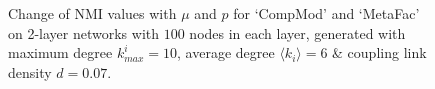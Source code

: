 \begin{figure}
\begin{center}

\end{center}\vspace{-0.22in}
\caption{Change of NMI values with $\mu$ and $p$ for `CompMod' and `MetaFac' on 2-layer networks with $100$ nodes in each layer,
generated with maximum degree $k^{i}_{max}=10$, average degree $\langle k_i\rangle=6$ \& coupling link density $d = 0.07$. }
\vspace{-0.22in}
\label{eval_syn}
\end{figure}

